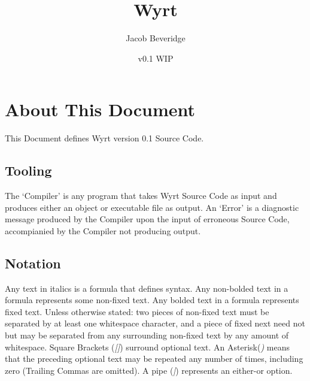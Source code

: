\documentclass{article}
\title{Wyrt}
\author{Jacob Beveridge}
\date{v0.1 WIP}
\begin{document}
\maketitle
\tableofcontents
\section{About This Document}
	This Document defines Wyrt version 0.1 Source Code.
	\subsection{Tooling} The `Compiler' is any program that takes Wyrt Source Code as input and produces either an object or executable file as output. An `Error' is a diagnostic message produced by the Compiler upon the input of erroneous Source Code, accompianied by the Compiler not producing output.
	\subsection{Notation} Any text in italics is a formula that defines syntax. Any non-bolded text in a formula represents some non-fixed text. Any bolded text in a formula represents fixed text. Unless otherwise stated: two pieces of non-fixed text must be separated by at least one whitespace character, and a piece of fixed next need not but may be separated from any surrounding non-fixed text by any amount of whitespace. Square Brackets (\textit{[]}) surround optional text. An Asterisk(\textit*) means that the preceding optional text may be repeated any number of times, including zero (Trailing Commas are omitted). A pipe (\textit{|}) represents an either-or option. 
\end{document}
